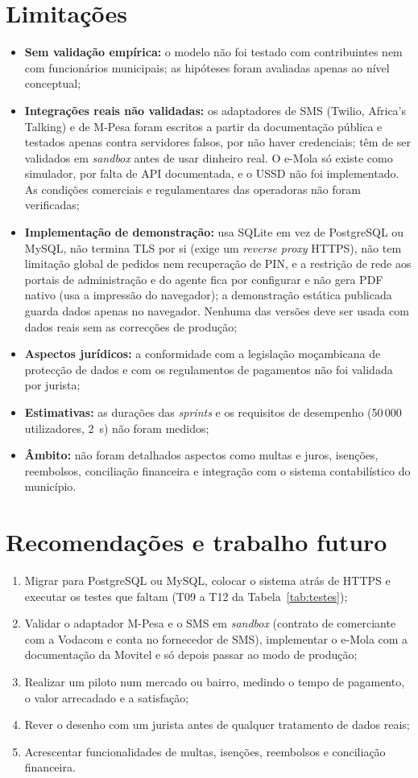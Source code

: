 \documentclass[12pt,a4paper,openany]{report}
\begin{document}
\section{Limitações}
\begin{itemize}
\item \textbf{Sem validação empírica:} o modelo não foi testado com contribuintes nem com funcionários municipais; as hipóteses foram avaliadas apenas ao nível conceptual;
\item \textbf{Integrações reais não validadas:} os adaptadores de SMS (Twilio, Africa's Talking) e de M-Pesa foram escritos a partir da documentação pública e testados apenas contra servidores falsos, por não haver credenciais; têm de ser validados em \emph{sandbox} antes de usar dinheiro real. O e-Mola só existe como simulador, por falta de API documentada, e o USSD não foi implementado. As condições comerciais e regulamentares das operadoras não foram verificadas;
\item \textbf{Implementação de demonstração:} usa SQLite em vez de PostgreSQL ou MySQL, não termina TLS por si (exige um \emph{reverse proxy} HTTPS), não tem limitação global de pedidos nem recuperação de PIN, e a restrição de rede aos portais de administração e do agente fica por configurar e não gera PDF nativo (usa a impressão do navegador); a demonstração estática publicada guarda dados apenas no navegador. Nenhuma das versões deve ser usada com dados reais sem as correcções de produção;
\item \textbf{Aspectos jurídicos:} a conformidade com a legislação moçambicana de protecção de dados e com os regulamentos de pagamentos não foi validada por jurista;
\item \textbf{Estimativas:} as durações das \emph{sprints} e os requisitos de desempenho (50\,000 utilizadores, 2~s) não foram medidos;
\item \textbf{Âmbito:} não foram detalhados aspectos como multas e juros, isenções, reembolsos, conciliação financeira e integração com o sistema contabilístico do município.
\end{itemize}

\section{Recomendações e trabalho futuro}
\begin{enumerate}
\item Migrar para PostgreSQL ou MySQL, colocar o sistema atrás de HTTPS e executar os testes que faltam (T09 a T12 da Tabela~\ref{tab:testes});
\item Validar o adaptador M-Pesa e o SMS em \emph{sandbox} (contrato de comerciante com a Vodacom e conta no fornecedor de SMS), implementar o e-Mola com a documentação da Movitel e só depois passar ao modo de produção;
\item Realizar um piloto num mercado ou bairro, medindo o tempo de pagamento, o valor arrecadado e a satisfação;
\item Rever o desenho com um jurista antes de qualquer tratamento de dados reais;
\item Acrescentar funcionalidades de multas, isenções, reembolsos e conciliação financeira.
\end{enumerate}
\end{document}
